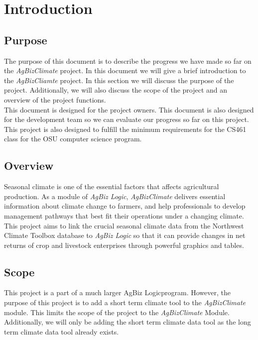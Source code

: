 \documentclass[onecolumn, draftclsnofoot,10pt, compsoc]{article}
\begin{document}
\section{Introduction}
	\subsection{Purpose}
		The purpose of this document is to describe the progress we have made so far on the \textit{AgBizClimate} project. In this document we will give a brief introduction to the \textit{AgBizCliamte} project. In this section we will discuss the purpose of the project. Additionally, we will also discuss the scope of the project and an overview of the project functions.\\
		This document is designed for the project owners. This document is also designed for the development team so we can evaluate our progress so far on this project. This project is also designed to fulfill the minimum requirements for the CS461 class for the OSU computer science program.\\

				\subsection{Overview}
			Seasonal climate is one of the essential factors that affects agricultural production. As a module of \textit{AgBiz Logic}, \textit{AgBizClimate} delivers essential information about climate change to farmers, and help professionals to develop management pathways that best fit their operations under a changing climate. This project aims to link the crucial seasonal climate data from the Northwest Climate Toolbox database to \textit{AgBiz Logic} so that it can provide changes in net returns of crop and livestock enterprises through powerful graphics and tables.\\

		\subsection{Scope}
			This project is a part of a much larger AgBiz Logic\texttrademark program. However, the purpose of this project is to add a short term climate tool to the \textit{AgBizClimate} module. This limits the scope of the project to the \textit{AgBizClimate} Module. Additionally, we will only be adding the short term climate data tool as the long term climate data tool already exists.\\
\end{document}
